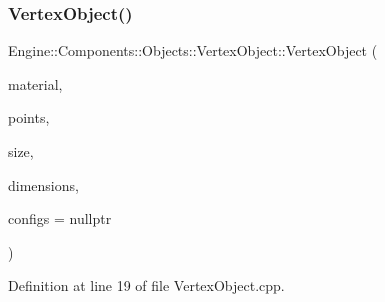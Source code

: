 \subsubsection{\texorpdfstring{Vertex\+Object()}{VertexObject()}}
{\footnotesize\ttfamily Engine\+::\+Components\+::\+Objects\+::\+Vertex\+Object\+::\+Vertex\+Object (\begin{DoxyParamCaption}\item[{\mbox{\hyperlink{classEngine_1_1Components_1_1Graphics_1_1Material}{Graphics\+::\+Material}} $\ast$}]{material,  }\item[{const float $\ast$}]{points,  }\item[{int}]{size,  }\item[{int}]{dimensions,  }\item[{\mbox{\hyperlink{classGeneric_1_1Collection}{Generic\+::\+Collection}}$<$ \mbox{\hyperlink{structEngine_1_1Components_1_1Objects_1_1VAOConfig}{V\+A\+O\+Config}} $\ast$$>$ $\ast$}]{configs = {\ttfamily nullptr} }\end{DoxyParamCaption})}



Definition at line 19 of file Vertex\+Object.\+cpp.



